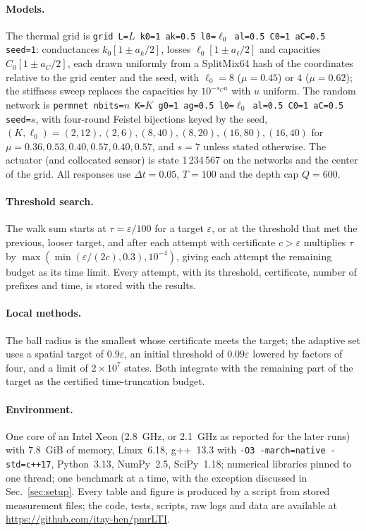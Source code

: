\documentclass[aps,pra,superscriptaddress,floatfix,longbibliography,twocolumn]{revtex4-2}
\begin{document}
\paragraph*{Models.} The thermal grid is \texttt{grid L=$L$ k0=1 ak=0.5 l0=$\ell_0$ al=0.5 C0=1 aC=0.5 seed=1}: conductances $k_0[1\pm a_k/2]$, losses $\ell_0[1\pm a_\ell/2]$ and capacities $C_0[1\pm a_C/2]$, each drawn uniformly from a SplitMix64 hash of the coordinates relative to the grid center and the seed, with $\ell_0=8$ ($\mu=0.45$) or $4$ ($\mu=0.62$); the stiffness sweep replaces the capacities by $10^{-s_Cu}$ with $u$ uniform. The random network is \texttt{permnet nbits=$n$ K=$K$ g0=1 ag=0.5 l0=$\ell_0$ al=0.5 C0=1 aC=0.5 seed=$s$}, with four-round Feistel bijections keyed by the seed, $(K,\ell_0)=(2,12),(2,6),(8,40),(8,20),(16,80),(16,40)$ for $\mu=0.36,0.53,0.40,0.57,0.40,0.57$, and $s=7$ unless stated otherwise. The actuator (and collocated sensor) is state 1\,234\,567 on the networks and the center of the grid. All responses use $\Delta t=0.05$, $T=100$ and the depth cap $Q=600$.

\paragraph*{Threshold search.} The walk sum starts at $\tau=\varepsilon/100$ for a target $\varepsilon$, or at the threshold that met the previous, looser target, and after each attempt with certificate $c>\varepsilon$ multiplies $\tau$ by $\max(\min(\varepsilon/(2c),0.3),10^{-4})$, giving each attempt the remaining budget as its time limit. Every attempt, with its threshold, certificate, number of prefixes and time, is stored with the results.

\paragraph*{Local methods.} The ball radius is the smallest whose certificate meets the target; the adaptive set uses a spatial target of $0.9\varepsilon$, an initial threshold of $0.09\varepsilon$ lowered by factors of four, and a limit of $2\times10^7$ states. Both integrate with the remaining part of the target as the certified time-truncation budget.

\paragraph*{Environment.} One core of an Intel Xeon (2.8~GHz, or 2.1~GHz as reported for the later runs) with 7.8~GiB of memory, Linux~6.18, g++~13.3 with \texttt{-O3 -march=native -std=c++17}, Python~3.13, NumPy~2.5, SciPy~1.18; numerical libraries pinned to one thread; one benchmark at a time, with the exception discussed in Sec.~\ref{sec:setup}. Every table and figure is produced by a script from stored measurement files; the code, tests, scripts, raw logs and data are available at \url{https://github.com/itay-hen/pmrLTI}.


\end{document}
